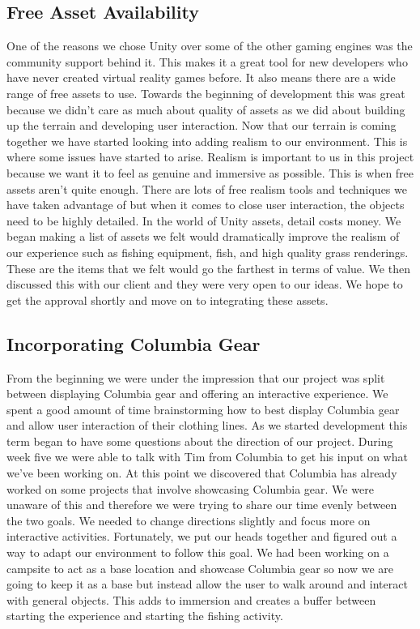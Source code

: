 \documentclass[10pt,journal,compsoc,onecolumn, draftclsnofoot]{IEEEtran}
\begin{document}
\subsection{Free Asset Availability}
One of the reasons we chose Unity over some of the other gaming engines was the community support behind it.
This makes it a great tool for new developers who have never created virtual reality games before.
It also means there are a wide range of free assets to use.
Towards the beginning of development this was great because we didn’t care as much about quality of assets as we did about building up the terrain and developing user interaction.
Now that our terrain is coming together we have started looking into adding realism to our environment.
This is where some issues have started to arise.
Realism is important to us in this project because we want it to feel as genuine and immersive as possible.
This is when free assets aren’t quite enough.
There are lots of free realism tools and techniques we have taken advantage of but when it comes to close user interaction, the objects need to be highly detailed.
In the world of Unity assets, detail costs money. We began making a list of assets we felt would dramatically improve the realism of our experience such as fishing equipment, fish, and high quality grass renderings.
These are the items that we felt would go the farthest in terms of value.
We then discussed this with our client and they were very open to our ideas.
We hope to get the approval shortly and move on to integrating these assets.

\subsection{Incorporating Columbia Gear}
From the beginning we were under the impression that our project was split between displaying Columbia gear and offering an interactive experience.
We spent a good amount of time brainstorming how to best display Columbia gear and allow user interaction of their clothing lines.
As we started development this term began to have some questions about the direction of our project.
During week five we were able to talk with Tim from Columbia to get his input on what we've been working on.
At this point we discovered that Columbia has already worked on some projects that involve showcasing Columbia gear.
We were unaware of this and therefore we were trying to share our time evenly between the two goals.
We needed to change directions slightly and focus more on interactive activities.
Fortunately, we put our heads together and figured out a way to adapt our environment to follow this goal.
We had been working on a campsite to act as a base location and showcase Columbia gear so now we are going to keep it as a base but instead allow the user to walk around and interact with general objects.
This adds to immersion and creates a buffer between starting the experience and starting the fishing activity.
\end{document}
